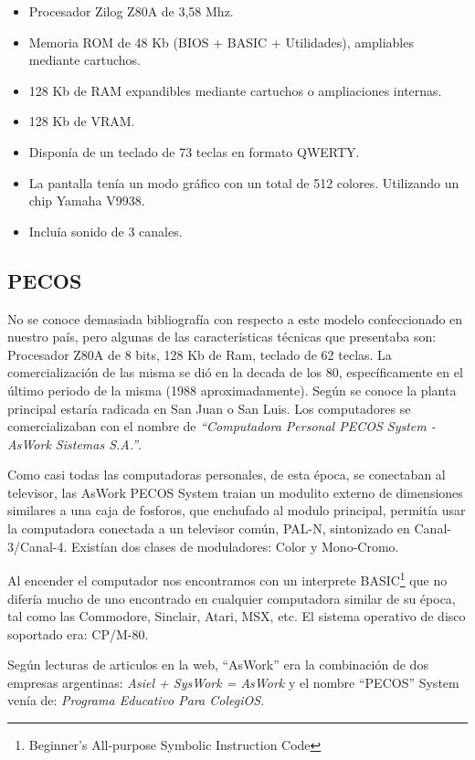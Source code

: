 \documentclass[%
 	final,
%
	notitlepage,
	narroweqnarray,
	inline,
 	twoside,
	]{ieee}
\begin{document}
\begin{itemize}
\item Procesador Zilog Z80A de 3,58 Mhz.
\item Memoria ROM de 48 Kb (BIOS + BASIC + Utilidades), ampliables mediante cartuchos.
\item 128 Kb de RAM expandibles mediante cartuchos o ampliaciones internas.
\item 128 Kb de VRAM.
\item Dispon\'ia de un teclado de 73 teclas en formato QWERTY.
\item La pantalla ten\'ia un modo gr\'afico con un total de 512 colores. Utilizando un chip Yamaha V9938.
\item Inclu\'ia sonido de 3 canales.
\end{itemize}

\subsection*{PECOS}

No se conoce demasiada bibliograf\'ia con respecto a este modelo confeccionado en nuestro pa\'is, pero algunas de las  caracter\'isticas t\'ecnicas que presentaba son: Procesador Z80A  de 8 bits, 128 Kb de Ram, teclado de 62 teclas. La comercializaci\'on de las misma se di\'o en la decada de los 80, espec\'ificamente en el \'ultimo periodo de la misma (1988 aproximadamente). Seg\'un se conoce la planta principal estar\'ia radicada en San Juan o San Luis. Los computadores se comercializaban con el nombre de \textit{``Computadora Personal PECOS System - AsWork Sistemas S.A.''}.

Como casi todas las computadoras personales, de esta \'epoca, se conectaban al televisor, las AsWork PECOS System traian un modulito externo de dimensiones similares a una caja de fosforos, que enchufado al modulo principal, permit\'ia usar la computadora conectada a un televisor com\'un, PAL-N, sintonizado en Canal-3/Canal-4. Exist\'ian dos clases de moduladores: Color y Mono-Cromo. 

Al encender el computador nos encontramos con un interprete BASIC\footnote{Beginner's All-purpose Symbolic Instruction Code} que no difer\'ia mucho de uno encontrado en cualquier computadora similar de su \'epoca, tal como las Commodore, Sinclair, Atari, MSX, etc. El sistema operativo de disco soportado era: CP/M-80.

Seg\'un lecturas de articulos en la web\cite{pecos}, ``AsWork'' era la combinaci\'on de dos empresas argentinas: \textit{Asiel + SysWork = AsWork} y el nombre ``PECOS'' System ven\'ia de: \textit{Programa Educativo Para ColegiOS.}
\end{document}
